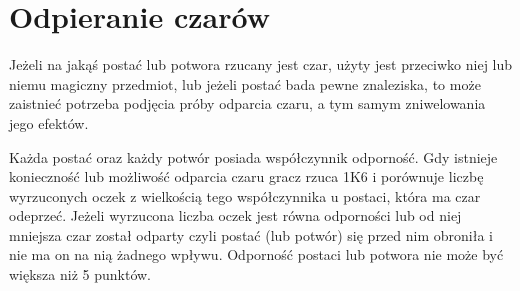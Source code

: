 \section{Odpieranie czarów}

Jeżeli na jakąś postać lub potwora rzucany jest czar, użyty jest przeciwko niej lub niemu magiczny przedmiot, lub jeżeli postać bada pewne znaleziska, to może zaistnieć potrzeba podjęcia próby odparcia czaru, a tym samym zniwelowania jego efektów.

Każda postać oraz każdy potwór posiada współczynnik odporność.
Gdy istnieje konieczność lub możliwość odparcia czaru gracz rzuca 1K6 i porównuje liczbę wyrzuconych oczek z wielkością tego współczynnika u postaci, która ma czar odeprzeć.
Jeżeli wyrzucona liczba oczek jest równa odporności lub od niej mniejsza czar został odparty czyli postać (lub potwór) się przed nim obroniła i nie ma on na nią żadnego wpływu.
Odporność postaci lub potwora nie może być większa niż 5 punktów.
